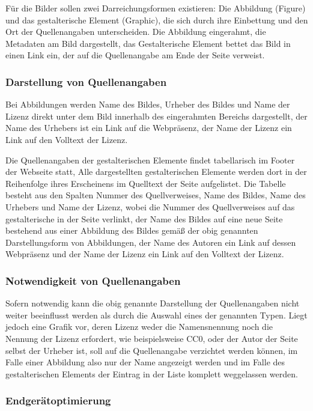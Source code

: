 Für die Bilder sollen zwei Darreichungsformen existieren: Die Abbildung
(Figure) und das gestalterische Element (Graphic), die sich durch ihre
Einbettung und den Ort der Quellenangaben unterscheiden. Die Abbildung
eingerahmt, die Metadaten am Bild dargestellt, das Gestalterische Element bettet
das Bild in einen Link ein, der auf die Quellenangabe am Ende der Seite verweist.

\subsubsection{Darstellung von Quellenangaben}

Bei Abbildungen werden Name des Bildes, Urheber des Bildes und Name der Lizenz
direkt unter dem Bild innerhalb des eingerahmten Bereichs dargestellt, der Name
des Urhebers ist ein Link auf die Webpräsenz, der Name der Lizenz ein Link
auf den Volltext der Lizenz.

Die Quellenangaben der gestalterischen Elemente findet tabellarisch im Footer der
Webseite statt, Alle dargestellten gestalterischen Elemente werden dort in der
Reihenfolge ihres Erscheinens im Quelltext der Seite aufgelistet. Die Tabelle
besteht aus den Spalten Nummer des Quellverweises, Name des Bildes,
Name des Urhebers und Name der Lizenz, wobei die Nummer des Quellverweises auf
das gestalterische in der Seite verlinkt, der Name des Bildes auf eine neue
Seite bestehend aus einer Abbildung des Bildes gemäß der obig genannten
Darstellungsform von Abbildungen, der Name des Autoren ein Link auf dessen
Webpräsenz und der Name der Lizenz ein Link auf den Volltext der Lizenz.

\subsubsection{Notwendigkeit von Quellenangaben}

Sofern notwendig kann die obig genannte Darstellung der Quellenangaben nicht
weiter beeinflusst werden als durch die Auswahl eines der genannten Typen. Liegt
jedoch eine Grafik vor, deren Lizenz weder die Namensnennung noch die Nennung
der Lizenz erfordert, wie beispielsweise CC0, oder der Autor der Seite selbst der
Urheber ist, soll auf die Quellenangabe verzichtet werden können, im Falle
einer Abbildung also nur der Name angezeigt werden und im Falle des
gestalterischen Elements der Eintrag in der Liste komplett weggelassen werden.

\subsubsection{Endgerätoptimierung}

